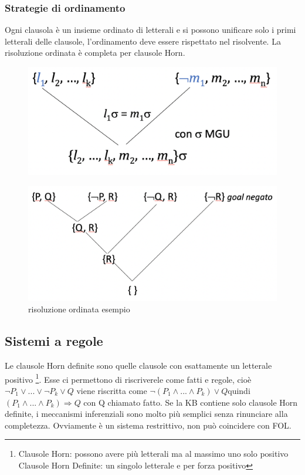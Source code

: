 \documentclass{article}
\begin{document}
\subsubsection{Strategie di ordinamento}
Ogni clausola è un insieme ordinato di letterali e si possono unificare solo i primi letterali delle clausole, l’ordinamento deve essere rispettato nel risolvente. La risoluzione ordinata è completa per clausole Horn.
\begin{figure}[H]
\centering
\includegraphics[scale=0.4]{Images/risoluzioneordinata.png}
\end{figure}
\begin{figure}[H]
\centering
\includegraphics[scale=0.4]{Images/risoluzioneordinataesempio.png}
\caption{risoluzione ordinata esempio}
\end{figure}

\subsection{Sistemi a regole}
Le clausole Horn definite sono quelle clausole con esattamente un letterale positivo \footnote{Clausole Horn: possono avere più letterali ma al massimo uno solo positivo \newline Clausole Horn Definite: un singolo letterale e per forza positivo}. Esse ci permettono di riscriverele come fatti e regole, cioè \newline
$\neg P_1 \lor ... \lor \neg P_k \lor Q$ \quad viene riscritta come \newline
$\neg (P_1 \land ... \land P_k) \lor Q$\quad quindi \newline
$(P_1 \land ... \land P_k) \Rightarrow Q$ con Q chiamato fatto. \newline
Se la KB contiene solo clausole Horn definite, i meccanismi inferenziali sono molto più semplici senza rinunciare alla completezza. Ovviamente è un sistema restrittivo, non può coincidere con FOL.
\end{document}
